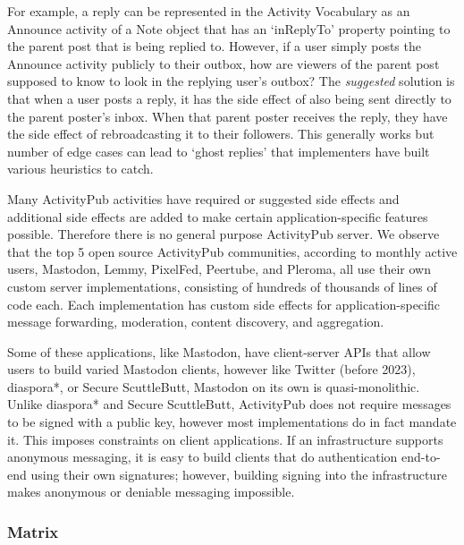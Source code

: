 For example, a reply can be represented in the Activity Vocabulary as an Announce activity of a Note object that has an `inReplyTo' property pointing to the parent post that is being replied to.
However, if a user simply posts the Announce activity publicly to their outbox, how are viewers of the parent post supposed to know to look in the replying user's outbox?
The \emph{suggested} solution is that when a user posts a reply, it has the side effect of also being sent directly to the parent poster's inbox. When that parent poster receives the reply, they have the side effect of rebroadcasting it to their followers.
This generally works but number of edge cases can lead to `ghost replies' that implementers have built various heuristics to catch.

Many ActivityPub activities have required or suggested side effects and additional side effects are added to make certain application-specific features possible.
Therefore there is no general purpose ActivityPub server.
We observe that the top 5 open source ActivityPub communities, according to monthly active users, Mastodon, Lemmy, PixelFed, Peertube, and Pleroma, all use their own custom server implementations, consisting of hundreds of thousands of lines of code each. Each implementation has custom side effects for application-specific message forwarding, moderation, content discovery, and aggregation.

Some of these applications, like Mastodon, have client-server APIs that allow users to build varied Mastodon clients, however like Twitter (before 2023), diaspora*, or Secure ScuttleButt, Mastodon on its own is quasi-monolithic.
Unlike diaspora* and Secure ScuttleButt, ActivityPub does not require messages to be signed with a public key, however most implementations do in fact mandate it.  This imposes constraints on client applications.   If an infrastructure supports anonymous messaging, it is easy to build clients that do authentication end-to-end using their own signatures; however, building signing into the infrastructure makes anonymous or deniable messaging impossible.

\subsubsection{Matrix}

